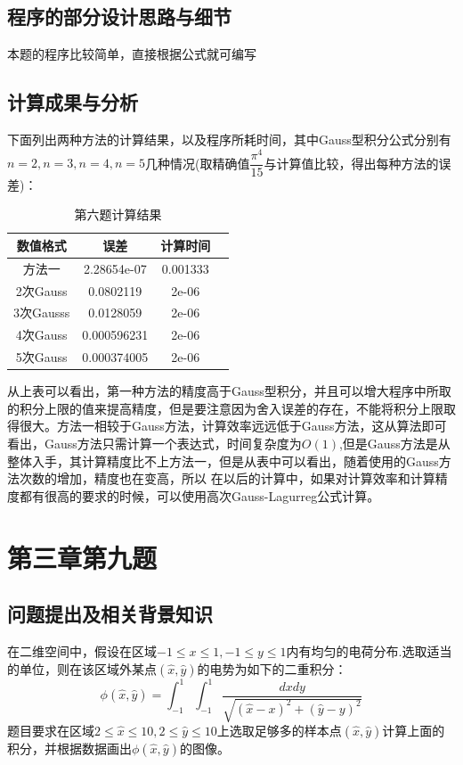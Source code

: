 \documentclass{ctexart}
\begin{document}
\subsection{程序的部分设计思路与细节}
本题的程序比较简单，直接根据公式就可编写
\subsection{计算成果与分析}
下面列出两种方法的计算结果，以及程序所耗时间，其中Gauss型积分公式分别有$n=2,n=3,n=4,n=5$几种情况(取精确值$\dfrac{\pi^4}{15}$与计算值比较，得出每种方法的误差)：
\begin{center}
\begin{longtable}{|c|c|c|c|}
\caption{第六题计算结果}\\
\hline
数值格式& 误差& 计算时间 \\
\hline
方法一& 2.28654e-07& 0.001333\\
\hline
2次Gauss& 0.0802119& 2e-06\\
\hline
3次Gausss& 0.0128059& 2e-06\\
\hline
4次Gauss& 0.000596231& 2e-06\\
\hline
5次Gauss& 0.000374005& 2e-06\\
\hline
\end{longtable}
\end{center}
从上表可以看出，第一种方法的精度高于Gauss型积分，并且可以增大程序中所取的积分上限的值来提高精度，但是要注意因为舍入误差的存在，不能将积分上限取得很大。方法一相较于Gauss方法，计算效率远远低于Gauss方法，这从算法即可看出，Gauss方法只需计算一个表达式，时间复杂度为$O(1)$,但是Gauss方法是从整体入手，其计算精度比不上方法一，但是从表中可以看出，随着使用的Gauss方法次数的增加，精度也在变高，所以
在以后的计算中，如果对计算效率和计算精度都有很高的要求的时候，可以使用高次Gauss-Lagurreg公式计算。
\section{第三章第九题}
\subsection{问题提出及相关背景知识}
在二维空间中，假设在区域$-1\leq x\leq 1,-1\leq y\leq 1$内有均匀的电荷分布.选取适当的单位，则在该区域外某点$(\widehat{x},\widehat{y})$的电势为如下的二重积分：
\[\phi(\widehat{x},\widehat{y})=\int_{-1}^{1}\int_{-1}^{1}\dfrac{dxdy}{\sqrt{(\widehat{x}-x)^2+(\widehat{y}-y)^2}}\]
题目要求在区域$2\leq \widehat{x}\leq 10,2\leq\widehat{y}\leq 10$上选取足够多的样本点$(\widehat{x},\widehat{y})$计算上面的积分，并根据数据画出$\phi(\widehat{x},\widehat{y})$的图像。
\end{document}
